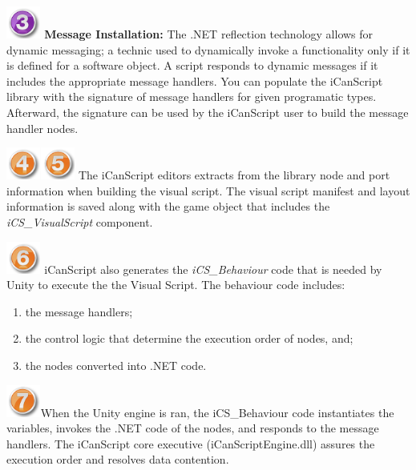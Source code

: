 \includegraphics[width=32pt,height=30pt]{stamp-3-purple.png} \textbf{Message Installation:} The .NET reflection technology allows for dynamic messaging; a technic used to dynamically invoke a functionality only if it is defined for a software object. A script responds to dynamic messages if it includes the appropriate message handlers. You can populate the iCanScript library with the signature of message handlers for given programatic types. Afterward, the signature can be used by the iCanScript user to build the message handler nodes.

\includegraphics[width=32pt,height=30pt]{stamp-4-orange.png}\includegraphics[width=32pt,height=30pt]{stamp-5-orange.png} The iCanScript editors extracts from the library node and port information when building the visual script. The visual script manifest and layout information is saved along with the game object that includes the \emph{iCS\_VisualScript} component.

\includegraphics[width=32pt,height=30pt]{stamp-6-orange.png} iCanScript also generates the \emph{iCS\_Behaviour} code that is needed by Unity to execute the the Visual Script. The behaviour code includes:

\begin{enumerate}
\item the message handlers;

\item the control logic that determine the execution order of nodes, and;

\item the nodes converted into .NET code.

\end{enumerate}

\includegraphics[width=32pt,height=30pt]{stamp-7-orange.png}When the Unity engine is ran, the iCS\_Behaviour code instantiates the variables, invokes the .NET code of the nodes, and responds to the message handlers. The iCanScript core executive (iCanScriptEngine.dll) assures the execution order and resolves data contention.

